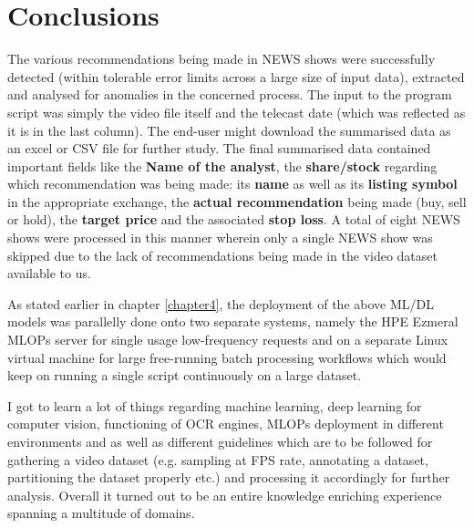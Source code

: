 \chapter{Conclusions} \label{chapter6}

The various recommendations being made in NEWS shows were successfully detected (within tolerable error limits across a large size of input data), extracted and analysed for anomalies in the concerned process.  The input to the program script was simply the video file itself and the telecast date (which was reflected as it is in the last column). The end-user might download the summarised data as an excel or CSV file for further study. The final summarised data contained important fields like the \textbf{Name of the analyst}, the \textbf{share/stock} regarding which recommendation was being made: its \textbf{name} as well as its \textbf{listing symbol} in the appropriate exchange, the \textbf{actual recommendation} being made (buy, sell or hold), the \textbf{target price} and the associated \textbf{stop loss}.  A total of eight NEWS shows were processed in this manner wherein only a single NEWS show was skipped due to the lack of recommendations being made in the video dataset available to us. \par

As stated earlier in chapter \ref{chapter4}, the deployment of the above ML/DL models was parallelly done onto two separate systems, namely the HPE Ezmeral MLOPs server for single usage low-frequency requests and on a separate Linux virtual machine for large free-running batch processing workflows which would keep on running a single script continuously on a large dataset. \par

I got to learn a lot of things regarding machine learning, deep learning for computer vision, functioning of OCR engines, MLOPs deployment in different environments and as well as different guidelines which are to be followed for gathering a video dataset (e.g. sampling at FPS rate, annotating a dataset, partitioning the dataset properly etc.) and processing it accordingly for further analysis. Overall it turned out to be an entire knowledge enriching experience spanning a multitude of domains.
